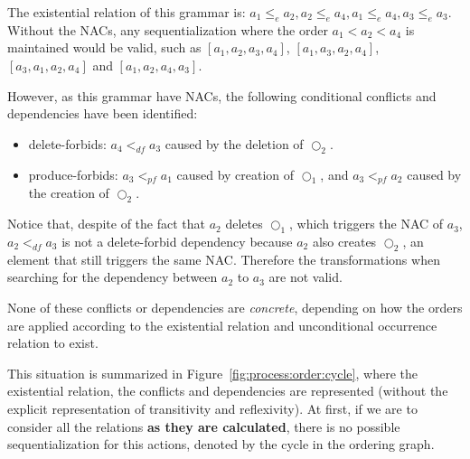 \begin{example}
  The existential relation of this grammar is: $a_1 \leq_e a_2, a_2 \leq_e a_4, a_1 \leq_e a_4, a_3 \leq_e a_3$. Without the NACs, any sequentialization where the order $a_1 < a_2 < a_4$ is maintained would be valid, such as $[a_1, a_2, a_3, a_4]$, $[a_1,a_3,a_2,a_4]$, $[a_3, a_1, a_2, a_4]$ and $[a_1,a_2,a_4,a_3]$.

  However, as this grammar have NACs, the following conditional conflicts and dependencies have been identified:
\begin{itemize}
  \item delete-forbids: $a_4 <_{df} a_3$ caused by the deletion of $\Circle_2$.
  \item produce-forbids: $a_3 <_{pf} a_1$ caused by creation of $\Circle_1$, and $a_3 <_{pf} a_2$ caused by the creation of $\Circle_2$.
\end{itemize}

  Notice that, despite of the fact that $a_2$ deletes $\Circle_1$, which triggers the NAC of $a_3$, $a_2 <_{df} a_3$ is not a delete-forbid dependency because $a_2$ also creates $\Circle_2$, an element that still triggers the same NAC. Therefore the transformations when searching for the dependency between $a_2$ to $a_3$ are not valid.

  None of these conflicts or dependencies are \emph{concrete}, depending on how the orders are applied according to the existential relation and unconditional occurrence relation to exist.
  
  This situation is summarized in Figure~\ref{fig:process:order:cycle}, where the existential relation, the conflicts and dependencies are represented (without the explicit representation of transitivity and reflexivity). At first, if we are to consider all the relations \textbf{as they are calculated}, there is no possible sequentialization for this actions, denoted by the cycle in the ordering graph.


\end{example}
